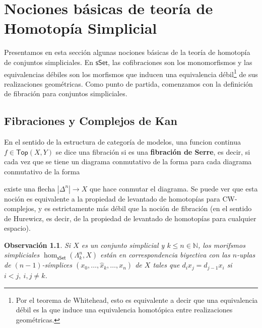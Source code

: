 \documentclass[11pt]{report}
\theoremstyle{colored}
\newtheorem{remark}{Observación}[section]
\newcommand{\N}{\mathbb{N}}
\newcommand{\cat}[1]{\mathsf{#1}}
\renewcommand{\ss}[1]{\Delta^{#1}}
\newcommand{\horn}[2]{\Lambda^{#1}_{#2}}
\begin{document}
\chapter{Nociones básicas de teoría de Homotopía Simplicial}

Presentamos en esta sección algunas nociones básicas de la teoría de homotopía de conjuntos simpliciales. En $\cat{sSet}$, las cofibraciones son los monomorfismos y las equivalencias débiles son los morfismos que inducen una equivalencia débil\footnote{Por el teorema de Whitehead, esto es equivalente a decir que una equivalencia débil es la que induce una equivalencia homotópica entre realizaciones geométricas.} de sus realizaciones geométricas. Como punto de partida, comenzamos con la definición de fibración para conjuntos simpliciales.

\section{Fibraciones y Complejos de Kan}

En el sentido de la estructura de categoría de modelos, una funcion continua $f \in \cat{Top}(X,Y)$ se dice una fibración si es una \textbf{fibración de Serre}, es decir, si cada vez que se tiene un diagrama conmutativo de la forma
para cada diagrama conmutativo de la forma
\begin{center}
\end{center}
existe una flecha $|\ss{n}| \to X$ que hace conmutar el diagrama. Se puede ver que esta noción es equivalente a la propiedad de levantado de homotopías para CW-complejos, y es estrictamente más débil que la noción de fibración (en el sentido de Hurewicz, es decir, de la propiedad de levantado de homotopías para cualquier espacio). 

\begin{remark} Si $X$ es un conjunto simplicial y $k \leq n \in \N$, los morifsmos simpliciales $\hom_{\cat{sSet}}(\horn{n}{k}, X)$ están en correspondencia biyectiva con las $n$-uplas de $(n-1)$-símplices $(x_0,\dots,\widehat{x}_k,\dots, x_n)$ de $X$ tales que $d_ix_j = d_{j-1}x_i$ si $i < j, \ i,j \neq k$. 
\end{remark}
\end{document}
